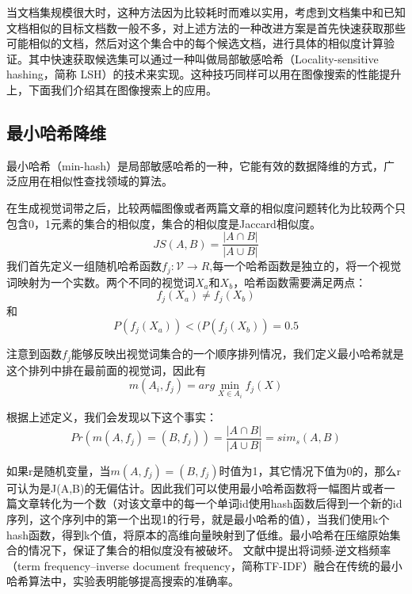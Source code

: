 当文档集规模很大时，这种方法因为比较耗时而难以实用，考虑到文档集中和已知文档相似的目标文档数一般不多，对上述方法的一种改进方案是首先快速获取那些可能相似的文档，然后对这个集合中的每个候选文档，进行具体的相似度计算验证。其中快速获取候选集可以通过一种叫做局部敏感哈希（Locality-sensitive hashing，简称 LSH）的技术来实现。这种技巧同样可以用在图像搜索的性能提升上，下面我们介绍其在图像搜索上的应用。

\subsection{最小哈希降维}
最小哈希（min-hash）是局部敏感哈希的一种，它能有效的数据降维的方式，广泛应用在相似性查找领域的算法。

在生成视觉词带之后，比较两幅图像或者两篇文章的相似度问题转化为比较两个只包含0，1元素的集合的相似度，集合的相似度是Jaccard相似度。
\begin{equation}
JS(A,B)=\frac{|A\cap{B}|}{|A\cup{B}|}
\end{equation}
我们首先定义一组随机哈希函数\(f_j:\mathcal{V} \to R\),每一个哈希函数是独立的，将一个视觉词映射为一个实数。两个不同的视觉词\(X_a\)和\(X_b\)，哈希函数需要满足两点：
\begin{equation}
f_j(X_a)\neq f_j(X_b)
\end{equation}
和
\begin{equation}
P(f_j(X_a)) < (P(f_j(X_b)) = 0.5
\end{equation}

注意到函数\(f_j\)能够反映出视觉词集合的一个顺序排列情况，我们定义最小哈希就是这个排列中排在最前面的视觉词，因此有
\begin{equation}
m(A_i,f_j)= arg\mathop {\min }\limits_{X \in A_i}f_j(X)
\end{equation}

根据上述定义，我们会发现以下这个事实：
\begin{equation}
Pr(m(A,f_j) = (B,f_j)) = \frac{|A\cap{B}|}{|A\cup{B}|} = sim_s(A,B)
\end{equation}

如果r是随机变量，当\(m(A,f_j) = (B,f_j)\)时值为1，其它情况下值为0的，那么r可认为是J(A,B)的无偏估计。因此我们可以使用最小哈希函数将一幅图片或者一篇文章转化为一个数（对该文章中的每一个单词id使用hash函数后得到一个新的id序列，这个序列中的第一个出现1的行号，就是最小哈希的值），当我们使用k个hash函数，得到k个值，将原本的高维向量映射到了低维。最小哈希在压缩原始集合的情况下，保证了集合的相似度没有被破坏。
文献\cite{Chum:2008jo}中提出将词频-逆文档频率（term frequency–inverse document frequency，简称TF-IDF）融合在传统的最小哈希算法中，实验表明能够提高搜索的准确率。

